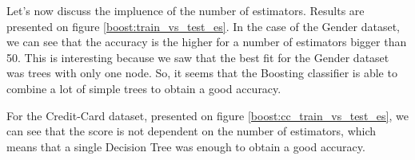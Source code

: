 \documentclass[10pt]{article}
\begin{document}
			Let's now discuss the impluence of the number of estimators. Results are presented on figure \ref{boost:train_vs_test_es}.
			In the case of the Gender dataset, we can see that the accuracy is the higher for a number of estimators bigger than 50. This is interesting because we saw that the best fit for the Gender dataset was trees with only one node. So, it seems that the Boosting classifier is able to combine a lot of simple trees to obtain a good accuracy.

			For the Credit-Card dataset, presented on figure \ref{boost:cc_train_vs_test_es}, we can see that the score is not dependent on the number of estimators, which means that a single Decision Tree was enough to obtain a good accuracy.
		\paragraph*{}
\end{document}
